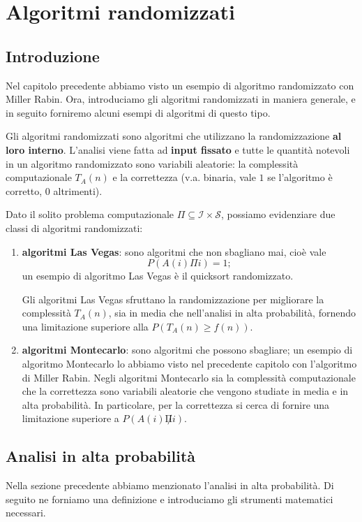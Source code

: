 \chapter{Algoritmi randomizzati}\label{ch:random}
\section{Introduzione}
Nel capitolo precedente abbiamo visto un esempio di algoritmo randomizzato con Miller Rabin. Ora, introduciamo gli algoritmi randomizzati in maniera generale, e in seguito forniremo alcuni esempi di algoritmi di questo tipo.

Gli algoritmi randomizzati sono algoritmi che utilizzano la randomizzazione \textbf{al loro interno}. L'analisi viene fatta ad \textbf{input fissato} e tutte le quantità notevoli in un algoritmo randomizzato sono variabili aleatorie: la complessità computazionale $T_A(n)$ e la correttezza (v.a. binaria, vale $1$ se l'algoritmo è corretto, $0$ altrimenti).

Dato il solito problema computazionale $\Pi \subseteq \mathcal{I}\times\mathcal{S}$, possiamo evidenziare due classi di algoritmi randomizzati:
\begin{enumerate}
\item \textbf{algoritmi Las Vegas}: sono algoritmi che non sbagliano mai, cioè vale
\[
P(A(i)\Pi i)=1;
\]
un esempio di algoritmo Las Vegas è il quicksort randomizzato.

Gli algoritmi Las Vegas sfruttano la randomizzazione per migliorare la complessità $T_A(n)$, sia in media che nell'analisi in alta probabilità, fornendo una limitazione superiore alla $P(T_A(n)\geq f(n))$.

\item \textbf{algoritmi Montecarlo}: sono algoritmi che possono sbagliare; un esempio di algoritmo Montecarlo lo abbiamo visto nel precedente capitolo con l'algoritmo di Miller Rabin. Negli algoritmi Montecarlo sia la complessità computazionale che la correttezza sono variabili aleatorie che vengono studiate in media e in alta probabilità. In particolare, per la correttezza si cerca di fornire una limitazione superiore a $P(A(i)\not\Pi i)$.
\end{enumerate}

\section{Analisi in alta probabilità}
Nella sezione precedente abbiamo menzionato l'analisi in alta probabilità. Di seguito ne forniamo una definizione e introduciamo gli strumenti matematici necessari.

